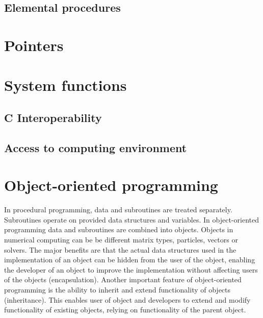 \subsection{Elemental procedures}


\section{Pointers}


\section{System functions}

\subsection{C Interoperability}


\subsection{Access to computing environment}

\section{Object-oriented programming}

In procedural programming, data and subroutines are treated separately. Subroutines operate on provided data structures and variables. In object-oriented programming data and subroutines are combined into objects. Objects in numerical computing can be  be different matrix types, particles, vectors or solvers. The major benefits are that the actual data structures used in the implementation of an object can be hidden from the user of the object, enabling the developer of an object to improve the implementation without affecting users of the objects (encapsulation). Another important feature of object-oriented programming is the ability to inherit and extend functionality of objects (inheritance). This enables user of object and developers to extend and modify functionality of existing objects, relying on functionality of the parent object. 

